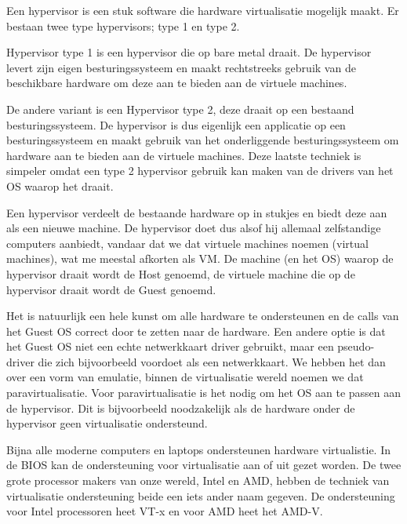 Een hypervisor is een stuk software die hardware virtualisatie mogelijk maakt. Er bestaan twee type hypervisors; type 1 en type 2.

Hypervisor type 1 is een hypervisor die op bare metal draait. De hypervisor levert zijn eigen besturingssysteem en maakt rechtstreeks gebruik van de beschikbare hardware om deze aan te bieden aan de virtuele machines.

De andere variant is een Hypervisor type 2, deze draait op een bestaand besturingssysteem. De hypervisor is dus eigenlijk een applicatie op een besturingssysteem en maakt gebruik van het onderliggende besturingssysteem om hardware aan te bieden aan de virtuele machines. Deze laatste techniek is simpeler omdat een type 2 hypervisor gebruik kan maken van de drivers van het OS waarop het draait.

Een hypervisor verdeelt de bestaande hardware op in stukjes en biedt deze aan als een nieuwe machine. De hypervisor doet dus alsof hij allemaal zelfstandige computers aanbiedt, vandaar dat we dat virtuele machines noemen (virtual machines), wat me meestal afkorten als VM. De machine (en het OS) waarop de hypervisor draait wordt de Host genoemd, de virtuele machine die op de hypervisor draait wordt de Guest genoemd.

Het is natuurlijk een hele kunst om alle hardware te ondersteunen en de calls van het Guest OS correct door te zetten naar de hardware. Een andere optie is dat het Guest OS niet een echte netwerkkaart driver gebruikt, maar een pseudo-driver die zich bijvoorbeeld voordoet als een netwerkkaart. We hebben het dan over een vorm van emulatie, binnen de virtualisatie wereld noemen we dat paravirtualisatie. Voor paravirtualisatie is het nodig om het OS aan te passen aan de hypervisor. Dit is bijvoorbeeld noodzakelijk als de hardware onder de hypervisor geen virtualisatie ondersteund.

Bijna alle moderne computers en laptops ondersteunen hardware virtualistie. In de BIOS kan de ondersteuning voor virtualisatie aan of uit gezet worden. De twee grote processor makers van onze wereld, Intel en AMD, hebben de techniek van virtualisatie ondersteuning beide een iets ander naam gegeven. De ondersteuning voor Intel processoren heet VT-x en voor AMD heet het AMD-V.
